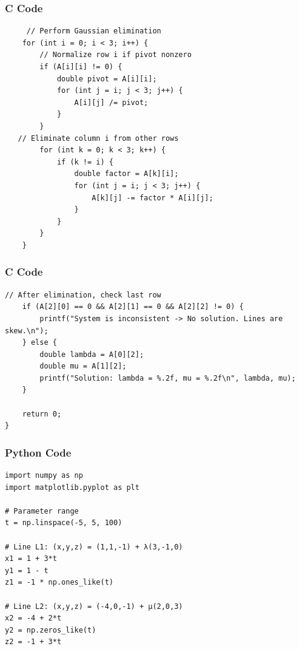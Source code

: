 \documentclass{beamer}
\begin{document}
\begin{frame}[fragile]
    \frametitle{C Code }
    \begin{lstlisting}
     // Perform Gaussian elimination
    for (int i = 0; i < 3; i++) {
        // Normalize row i if pivot nonzero
        if (A[i][i] != 0) {
            double pivot = A[i][i];
            for (int j = i; j < 3; j++) {
                A[i][j] /= pivot;
            }
        }
   // Eliminate column i from other rows
        for (int k = 0; k < 3; k++) {
            if (k != i) {
                double factor = A[k][i];
                for (int j = i; j < 3; j++) {
                    A[k][j] -= factor * A[i][j];
                }
            }
        }
    }

\end{lstlisting}
\end{frame}
\begin{frame}[fragile]
\frametitle{C Code }
\begin{lstlisting}
// After elimination, check last row
    if (A[2][0] == 0 && A[2][1] == 0 && A[2][2] != 0) {
        printf("System is inconsistent -> No solution. Lines are skew.\n");
    } else {
        double lambda = A[0][2];
        double mu = A[1][2];
        printf("Solution: lambda = %.2f, mu = %.2f\n", lambda, mu);
    }

    return 0;
}

\end{lstlisting}
\end{frame}
\begin{frame}[fragile]
\frametitle{Python Code}
\begin{lstlisting}
import numpy as np
import matplotlib.pyplot as plt

# Parameter range
t = np.linspace(-5, 5, 100)

# Line L1: (x,y,z) = (1,1,-1) + λ(3,-1,0)
x1 = 1 + 3*t
y1 = 1 - t
z1 = -1 * np.ones_like(t)

# Line L2: (x,y,z) = (-4,0,-1) + μ(2,0,3)
x2 = -4 + 2*t
y2 = np.zeros_like(t)
z2 = -1 + 3*t

\end{lstlisting}
\end{frame}
\end{document}
